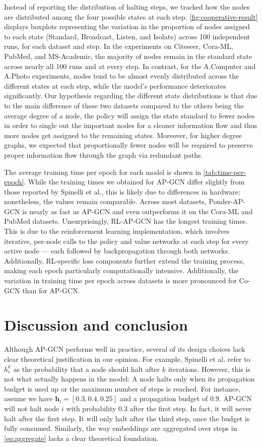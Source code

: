 \documentclass{gdl}
\begin{document}
Instead of reporting the distribution of halting steps, we tracked how the nodes are distributed among the four possible states at each step. \autoref{fig:cooperative-result} displays boxplots representing the variation in the proportion of nodes assigned to each state (Standard, Broadcast, Listen, and Isolate) across 100 independent runs, for each dataset and step. In the experiments on Citeseer, Cora-ML, PubMed, and MS-Academic, the majority of nodes remain in the standard state across nearly all 100 runs and at every step. In contrast, for the A.Computer and A.Photo experiments, nodes tend to be almost evenly distributed across the different states at each step, while the model's performance deteriorates significantly. Our hypothesis regarding the different state distributions is that due to the main difference of these two datasets compared to the others being the average degree of a node, the policy will assign the state standard to fewer nodes in order to single out the important nodes for a cleaner information flow and thus more nodes get assigned to the remaining states. Moreover, for higher degree graphs, we expected that proportionally fewer nodes will be required to preserve proper information flow through the graph via redundant paths.

The average training time per epoch for each model is shown in \autoref{tab:time-per-epoch}. While the training times we obtained for AP-GCN differ slightly from those reported by Spinelli et al., this is likely due to differences in hardware; nonetheless, the values remain comparable. Across most datasets, Ponder-AP-GCN is nearly as fast as AP-GCN and even outperforms it on the Cora-ML and PubMed datasets. Unsurprisingly, RL-AP-GCN has the longest training times. This is due to the reinforcement learning implementation, which involves iterative, per-node calls to the policy and value networks at each step for every active node --- each followed by backpropagation through both networks. Additionally, RL-specific loss components further extend the training process, making each epoch particularly computationally intensive. Additionally, the variation in training time per epoch across datasets is more pronounced for Co-GCN than for AP-GCN.

\section{Discussion and conclusion}
Although AP-GCN performs well in practice, several of its design choices lack clear theoretical justification in our opinion. For example, Spinelli et al. refer to $h_i^k$ as the probability that a node should halt after $k$ iterations. However, this is not what actually happens in the model: A node halts only when its propagation budget is used up or the maximum number of steps is reached. For instance, assume we have $\mathbf{h}_i = [0.3, 0.4, 0.25]$ and a propagation budget of $0.9$. AP-GCN will not halt node $i$ with probability $0.3$ after the first step. In fact, it will never halt after the first step. It will only halt after the third step, once the budget is fully consumed. Similarly, the way embeddings are aggregated over steps in \autoref{eq:aggregate} lacks a clear theoretical foundation.
\end{document}
